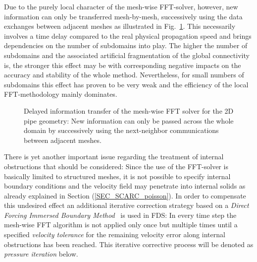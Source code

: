 Due to the purely local character of the mesh-wise FFT-solver, however, new information can only be transferred mesh-by-mesh, successively using the data exchanges between adjacent meshes  as illustrated in Fig.~\ref{FIG_SCARC_mesh_wise_transfer}.
%
This necessarily involves a time delay compared to the real physical propagation speed and brings dependencies on the number of subdomains into play.
The higher the number of subdomains and the associated artificial fragmentation of the global connectivity is, the stronger this effect may be with corresponding negative impacts on the accuracy and stability of the whole method.
Nevertheless, for small numbers of subdomains this effect has proven to be very weak and the efficiency of the local FFT-methodology mainly dominates.

\begin{center}
\begin{figure}[ht]
\begin{minipage}{4.3cm}

\end{minipage}
\begin{minipage}{3.9cm}

\end{minipage}
\begin{minipage}{3.9cm}

\end{minipage}
\begin{minipage}{3.9cm}

\end{minipage}
\caption[Delayed information transfer of the mesh-wise FFT solver]{Delayed information transfer of the mesh-wise FFT solver for the 2D pipe geometry: New information can only be passed across the whole domain by successively using the next-neighbor communications between adjacent meshes.}
\label{FIG_SCARC_mesh_wise_transfer}
\end{figure}
\end{center}



There is yet another important issue regarding the treatment of internal obstructions that should be considered:
Since the use of the FFT-solver is basically limited to structured meshes, it is not possible to specify internal boundary conditions and the velocity field may penetrate into internal solids as already explained in Section (\ref{SEC_SCARC_poisson}). 
%
In order to compensate this undesired effect an additional iterative correction strategy based on a {\it Direct Forcing Immersed Boundary Method}~\cite{Fadlun:2000} is used in FDS: In every time step the mesh-wise FFT algorithm is not applied only once but multiple times until a specified {\it velocity tolerance} for the remaining velocity error along internal obstructions has been reached. This iterative corrective process will be denoted as {\it pressure iteration} below.

